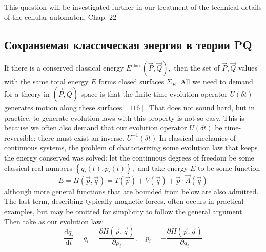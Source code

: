 \documentclass[main.tex]{subfiles}
\begin{document}
This question will be investigated further in our treatment of the technical details
of the cellular automaton, Chap. 22


\subsection{Сохраняемая классическая энергия в теории PQ}\label{ch19.3}

If there is a conserved classical energy $E^{\mathrm{class}}(\vec{P}, \vec{Q}),$ then the set of $\vec{P}, \vec{Q}$ values with the same total energy $E$ forms closed surfaces $\Sigma_{E} .$ All we need to demand for a theory in $(\vec{P}, \vec{Q})$ space is that the finite-time evolution operator $U(\delta t)$ generates motion along these surfaces $[116] .$ That does not sound hard, but in practice, to generate evolution laws with this property is not so easy. This is because we often also demand that our evolution operator $U(\delta t)$ be time-reversible: there must exist an inverse, $U^{-1}(\delta t)$
In classical mechanics of continuous systems, the problem of characterizing some evolution law that keeps the energy conserved was solved: let the continuous degrees of freedom be some classical real numbers $\left\{q_{i}(t), p_{i}(t)\right\},$ and take energy
$E$ to be some function
$$
E=H(\vec{p}, \vec{q})=T(\vec{p})+V(\vec{q})+\vec{p} \cdot \vec{A}(\vec{q})
$$
although more general functions that are bounded from below are also admitted. The last term, describing typically magnetic forces, often occurs in practical examples, but may be omitted for simplicity to follow the general argument. Then take as our evolution law:
$$
\frac{\mathrm{d} q_{i}}{\mathrm{d} t}=\dot{q}_{i}=\frac{\partial H(\vec{p}, \vec{q})}{\partial p_{i}}, \quad \dot{p}_{i}=-\frac{\partial H(\vec{p}, \vec{q})}{\partial q_{i}}
$$
\end{document}
